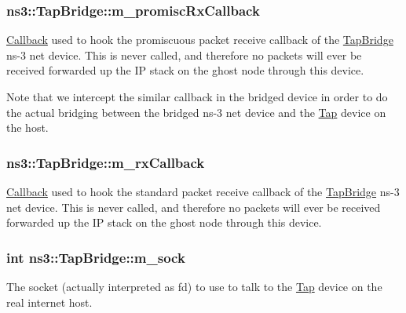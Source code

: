 \subsubsection[{\texorpdfstring{m\+\_\+promisc\+Rx\+Callback}{m_promiscRxCallback}}]{ ns3\+::\+Tap\+Bridge\+::m\+\_\+promisc\+Rx\+Callback\hspace{0.3cm}{\ttfamily [private]}}\hypertarget{classns3_1_1TapBridge_a4a1f6dcd199836a8bff03691a240af4a}{}\label{classns3_1_1TapBridge_a4a1f6dcd199836a8bff03691a240af4a}
\hyperlink{classns3_1_1Callback}{Callback} used to hook the promiscuous packet receive callback of the \hyperlink{classns3_1_1TapBridge}{Tap\+Bridge} ns-\/3 net device. This is never called, and therefore no packets will ever be received forwarded up the IP stack on the ghost node through this device.

Note that we intercept the similar callback in the bridged device in order to do the actual bridging between the bridged ns-\/3 net device and the \hyperlink{classns3_1_1Tap}{Tap} device on the host. 
\subsubsection[{\texorpdfstring{m\+\_\+rx\+Callback}{m_rxCallback}}]{ ns3\+::\+Tap\+Bridge\+::m\+\_\+rx\+Callback\hspace{0.3cm}{\ttfamily [private]}}\hypertarget{classns3_1_1TapBridge_a6e0e402ed4fc1b67796220bf915cfbae}{}\label{classns3_1_1TapBridge_a6e0e402ed4fc1b67796220bf915cfbae}
\hyperlink{classns3_1_1Callback}{Callback} used to hook the standard packet receive callback of the \hyperlink{classns3_1_1TapBridge}{Tap\+Bridge} ns-\/3 net device. This is never called, and therefore no packets will ever be received forwarded up the IP stack on the ghost node through this device. 
\subsubsection[{\texorpdfstring{m\+\_\+sock}{m_sock}}]{\setlength{\rightskip}{0pt plus 5cm}int ns3\+::\+Tap\+Bridge\+::m\+\_\+sock\hspace{0.3cm}{\ttfamily [private]}}\hypertarget{classns3_1_1TapBridge_a52d87d41aa840377feebe63b5c5f2f3c}{}\label{classns3_1_1TapBridge_a52d87d41aa840377feebe63b5c5f2f3c}
The socket (actually interpreted as fd) to use to talk to the \hyperlink{classns3_1_1Tap}{Tap} device on the real internet host. 
